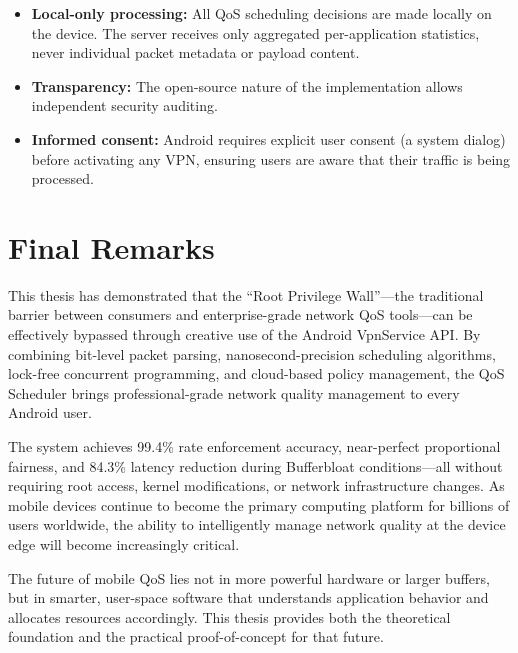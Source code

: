 \begin{itemize}[noitemsep]
    \item \textbf{Local-only processing:} All QoS scheduling decisions are made locally on the device. The server receives only aggregated per-application statistics, never individual packet metadata or payload content.
    \item \textbf{Transparency:} The open-source nature of the implementation allows independent security auditing.
    \item \textbf{Informed consent:} Android requires explicit user consent (a system dialog) before activating any VPN, ensuring users are aware that their traffic is being processed.
\end{itemize}

\section{Final Remarks}

This thesis has demonstrated that the ``Root Privilege Wall''---the traditional barrier between consumers and enterprise-grade network QoS tools---can be effectively bypassed through creative use of the Android VpnService API. By combining bit-level packet parsing, nanosecond-precision scheduling algorithms, lock-free concurrent programming, and cloud-based policy management, the QoS Scheduler brings professional-grade network quality management to every Android user.

The system achieves 99.4\% rate enforcement accuracy, near-perfect proportional fairness, and 84.3\% latency reduction during Bufferbloat conditions---all without requiring root access, kernel modifications, or network infrastructure changes. As mobile devices continue to become the primary computing platform for billions of users worldwide, the ability to intelligently manage network quality at the device edge will become increasingly critical.

The future of mobile QoS lies not in more powerful hardware or larger buffers, but in smarter, user-space software that understands application behavior and allocates resources accordingly. This thesis provides both the theoretical foundation and the practical proof-of-concept for that future.
